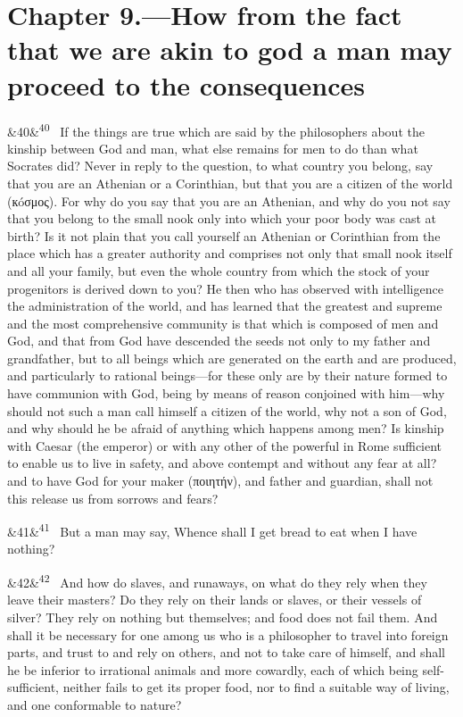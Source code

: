\documentclass[12pt]{article}
\newcommand{\para}[1][]{\par\noindent\ifx&#1&\else\textsuperscript{\footnotesize #1}~\fi}
\begin{document}
\section*{Chapter 9.---How from the fact that we are akin to god a man may proceed to the consequences}

\para[40] If the things are true which are said by the philosophers about the kinship between God and man, what else remains for men to do than what Socrates did? Never in reply to the question, to what country you belong, say that you are an Athenian or a Corinthian, but that you are a citizen of the world (кóσμος). For why do you say that you are an Athenian, and why do you not say that you belong to the small nook only into which your poor body was cast at birth? Is it not plain that you call yourself an Athenian or Corinthian from the place which has a greater authority and comprises not only that small nook itself and all your family, but even the whole country from which the stock of your progenitors is derived down to you? He then who has observed with intelligence the administration of the world, and has learned that the greatest and supreme and the most comprehensive community is that which is composed of men and God, and that from God have descended the seeds not only to my father and grandfather, but to all beings which are generated on the earth and are produced, and particularly to rational beings—for these only are by their nature formed to have communion with God, being by means of reason conjoined with him—why should not such a man call himself a citizen of the world, why not a son of God, and why should he be afraid of anything which happens among men? Is kinship with Caesar (the emperor) or with any other of the powerful in Rome sufficient to enable us to live in safety, and above contempt and without any fear at all? and to have God for your maker (ποιητήν), and father and guardian, shall not this release us from sorrows and fears?

\para[41] But a man may say, Whence shall I get bread to eat when I have nothing?

\para[42] And how do slaves, and runaways, on what do they rely when they leave their masters? Do they rely on their lands or slaves, or their vessels of silver? They rely on nothing but themselves; and food does not fail them. And shall it be necessary for one among us who is a philosopher to travel into foreign parts, and trust to and rely on others, and not to take care of himself, and shall he be inferior to irrational animals and more cowardly, each of which being self-sufficient, neither fails to get its proper food, nor to find a suitable way of living, and one conformable to nature?
\end{document}
